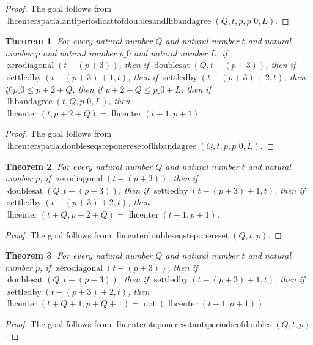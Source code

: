 \documentclass[11pt]{article}
\newtheorem{theorem}{Theorem}[section]
\theoremstyle{definition}
\begin{document}
\begin{proof}
The goal follows from \(\operatorname{lhcenterspatialantiperiodicattofdoublesandlhbandagree}(Q, t, p, p\_0, L)\).
\end{proof}
\begin{theorem}
\label{ll:paper:lhcenter-spatial-doubles-eq-step-one-reset-of-lhbandagree}
For every natural number \(Q\) and natural number \(t\) and natural number \(p\) and natural number \(p\_0\) and natural number \(L\), if \(\operatorname{zerodiagonal}(t - (p + 3))\), then if \(\operatorname{doublesat}(Q, t - (p + 3))\), then if \(\operatorname{settledby}(t - (p + 3) + 1, t)\), then if \(\operatorname{settledby}(t - (p + 3) + 2, t)\), then if \(p\_0 \le p + 2 + Q\), then if \(p + 2 + Q \le p\_0 + L\), then if \(\operatorname{lhbandagree}(t, Q, p\_0, L)\), then \(\operatorname{lhcenter}(t, p + 2 + Q) = \operatorname{lhcenter}(t + 1, p + 1)\).
\end{theorem}
\begin{proof}
The goal follows from \(\operatorname{lhcenterspatialdoubleseqsteponeresetoflhbandagree}(Q, t, p, p\_0, L)\).
\end{proof}
\begin{theorem}
\label{ll:paper:lhcenter-doubles-eq-step-one-reset}
For every natural number \(Q\) and natural number \(t\) and natural number \(p\), if \(\operatorname{zerodiagonal}(t - (p + 3))\), then if \(\operatorname{doublesat}(Q, t - (p + 3))\), then if \(\operatorname{settledby}(t - (p + 3) + 1, t)\), then if \(\operatorname{settledby}(t - (p + 3) + 2, t)\), then \(\operatorname{lhcenter}(t + Q, p + 2 + Q) = \operatorname{lhcenter}(t + 1, p + 1)\).
\end{theorem}
\begin{proof}
The goal follows from \(\operatorname{lhcenterdoubleseqsteponereset}(Q, t, p)\).
\end{proof}
\begin{theorem}
\label{ll:paper:lhcenter-step-one-reset-antiperiodic-of-doubles}
For every natural number \(Q\) and natural number \(t\) and natural number \(p\), if \(\operatorname{zerodiagonal}(t - (p + 3))\), then if \(\operatorname{doublesat}(Q, t - (p + 3))\), then if \(\operatorname{settledby}(t - (p + 3) + 1, t)\), then if \(\operatorname{settledby}(t - (p + 3) + 2, t)\), then \(\operatorname{lhcenter}(t + Q + 1, p + Q + 1) = \operatorname{not}(\operatorname{lhcenter}(t + 1, p + 1))\).
\end{theorem}
\begin{proof}
The goal follows from \(\operatorname{lhcentersteponeresetantiperiodicofdoubles}(Q, t, p)\).
\end{proof}
\end{document}
